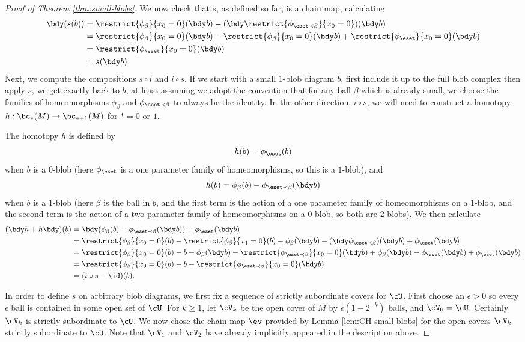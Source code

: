 \begin{proof}[Proof of Theorem \ref{thm:small-blobs}]
We now check that $s$, as defined so far, is a chain map, calculating
\begin{align*}
\bdy (s(b)) & = \restrict{\phi_\beta}{x_0=0}(\bdy b) - (\bdy \restrict{\phi_{\eset \prec \beta}}{x_0=0})(\bdy b) \\
		 & = \restrict{\phi_\beta}{x_0=0}(\bdy b) - \restrict{\phi_\beta}{x_0=0}(\bdy b) + \restrict{\phi_\eset}{x_0=0}(\bdy b) \\
		 & = \restrict{\phi_\eset}{x_0=0}(\bdy b) \\
		 & = s(\bdy b)
\end{align*}
Next, we compute the compositions $s \circ i$ and $i \circ s$. If we start with a small $1$-blob diagram $b$, first include it up to the full blob complex then apply $s$, we get exactly back to $b$, at least assuming we adopt the convention that for any ball $\beta$ which is already small, we choose the families of homeomorphisms $\phi_\beta$ and $\phi_{\eset \prec \beta}$ to always be the identity. In the other direction, $i \circ s$, we will need to construct a homotopy $h:\bc_*(M) \to \bc_{*+1}(M)$ for $*=0$ or $1$.

The homotopy $h$ is defined by $$h(b) = \phi_\eset(b)$$ when $b$ is a $0$-blob (here $\phi_\eset$ is a one parameter family of homeomorphisms, so this is a $1$-blob), and $$h(b) = \phi_\beta(b) - \phi_{\eset \prec \beta}(\bdy b)$$ when $b$ is a $1$-blob (here $\beta$ is the ball in $b$, and the first term is the action of a one parameter family of homeomorphisms on a $1$-blob, and the second term is the action of a two parameter family of homeomorphisms on a $0$-blob, so both are $2$-blobs). We then calculate
\begin{align*}
(\bdy h+h \bdy)(b) & = \bdy (\phi_{\beta}(b) - \phi_{\eset \prec \beta}(\bdy b)) + \phi_\eset(\bdy b)  \\
	& =  \restrict{\phi_\beta}{x_0=0}(b) - \restrict{\phi_\beta}{x_1=0}(b) - \phi_\beta(\bdy b) - (\bdy \phi_{\eset \prec \beta})(\bdy b) + \phi_\eset(\bdy b) \\
	& =  \restrict{\phi_\beta}{x_0=0}(b) - b - \phi_\beta(\bdy b) - \restrict{\phi_{\eset \prec \beta}}{x_0=0}(\bdy b) +  \phi_\beta(\bdy b) - \phi_\eset(\bdy b) + \phi_\eset(\bdy b) \\
	& = \restrict{\phi_\beta}{x_0=0}(b) - b - \restrict{\phi_{\eset \prec \beta}}{x_0=0}(\bdy b) \\
	& = (i \circ s - \id)(b).
\end{align*}


In order to define $s$ on arbitrary blob diagrams, we first fix a sequence of strictly subordinate covers for $\cU$. First choose an $\epsilon > 0$ so every $\epsilon$ ball is contained in some open set of $\cU$. For $k \geq 1$, let $\cV_{k}$ be the open cover of $M$ by $\epsilon (1-2^{-k})$ balls, and $\cV_0 = \cU$. Certainly $\cV_k$ is strictly subordinate to $\cU$. We now chose the chain map $\ev$ provided by Lemma \ref{lem:CH-small-blobs} for the open covers $\cV_k$ strictly subordinate to $\cU$. Note that $\cV_1$ and $\cV_2$ have already implicitly appeared in the description above.


\end{proof}
